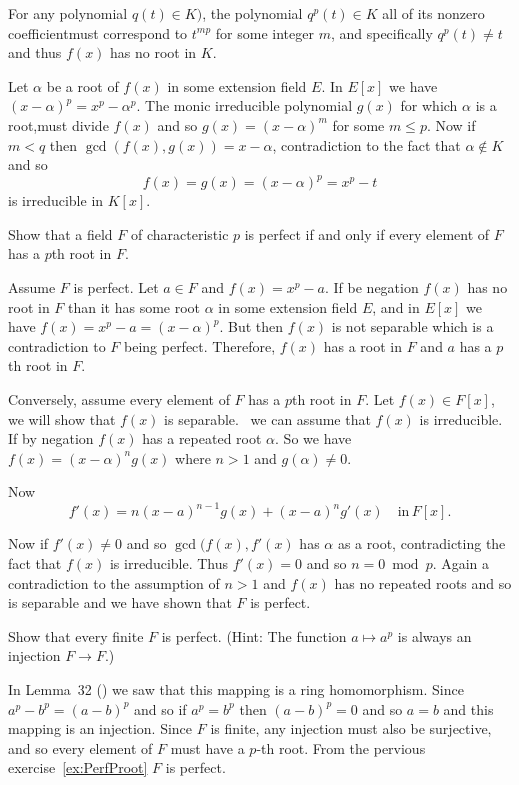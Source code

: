 \begin{myenumerate}
For any polynomial \(q(t)\in K)\), the polynomial \(q^p(t)\in K\)
all of its nonzero coefficientmust correspond
to \(t^{mp}\) for some integer $m$, and specifically \(q^p(t)\neq t\)
and thus \(f(x)\) has no root in $K$.

Let \(\alpha\) be a root of \(f(x)\) in some extension field $E$.
In \(E[x]\) we have \((x-\alpha)^p=x^p-\alpha^p\).
The monic irreducible polynomial \(g(x)\) for which \(\alpha\)
is a root,must divide \(f(x)\) and so \(g(x)=(x-\alpha)^m\)
for some \(m\leq p\).
Now if \(m<q\) then \(\gcd(f(x),g(x))=x-\alpha\), contradiction
to the fact that \(\alpha\notin K\) and so
\[f(x) = g(x) = (x - \alpha)^p = x^p - t\]
is irreducible in \(K[x]\).

\item
\begin{excopy}
Show that
\label{ex:PerfProot}
a field $F$ of characteristic $p$ is perfect if and only if
every element of $F$ has a $p$th root in $F$.
\end{excopy}

Assume $F$ is perfect. Let \(a\in F\) and
\(f(x)=x^p-a\).
If be negation \(f(x)\) has no root in $F$
than it has some root \(\alpha\) in some extension field $E$,
and in \(E[x]\) we have \(f(x) = x^p - a = (x - \alpha)^p\).
But then \(f(x)\) is not separable which is
a contradiction to $F$ being perfect. Therefore,
\(f(x)\) has a root in $F$ and $a$ has a $p$th root in $F$.

Conversely, assume every element of $F$ has a $p$th root in $F$.
Let \(f(x)\in F[x]\), we will show that \(f(x)\) is separable.
\Wlogy\ we can assume that \(f(x)\) is irreducible.
If by negation \(f(x)\) has a repeated root \(\alpha\).
So we have  \(f(x)=(x-\alpha)^n g(x)\) where \(n>1\) and
\(g(\alpha)\neq 0\).

Now
\begin{equation*}
 f'(x) = n(x-a)^{n-1}g(x) + (x-a)^n g'(x)  \quad\textrm{in}\, F[x].
\end{equation*}

Now if \(f'(x)\neq 0\) and so \(\gcd(f(x),f'(x)\) has \(\alpha\)
as a root, contradicting the fact that \(f(x)\) is irreducible.
Thus \(f'(x)=0\) and so \(n=0 \bmod p\).
Again a contradiction to the assumption of \(n>1\)
and \(f(x)\) has no repeated roots and so is separable
and we have shown that $F$ is perfect.


\item
\begin{excopy}
Show that every finite $F$ is perfect. (Hint:
The function \(a\mapsto a^p\) is always an injection \(F\rightarrow F\).)
\end{excopy}

In Lemma~32 (\cite{Rotman98}) we saw that this mapping
is a ring homomorphism. Since \(a^p-b^p = (a-b)^p\)
and so if \(a^p=b^p\) then \((a-b)^p=0\) and so \(a=b\)
and this mapping is an injection.
Since $F$ is finite, any injection must also be surjective,
and so every element of $F$ must have a $p$-th root.
From the pervious exercise~\ref{ex:PerfProot} $F$ is perfect.


\end{myenumerate}


